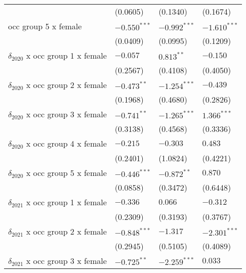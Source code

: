 \begin{tabular}{llll}
                                       &           (0.0605) &           (0.1340) &           (0.1674) \\
occ group 5 x female                   &     $-0.550^{***}$ &     $-0.992^{***}$ &     $-1.610^{***}$ \\
                                       &           (0.0409) &           (0.0995) &           (0.1209) \\
$\delta_{2020}$ x occ group 1 x female &           $-0.057$ &       $0.813^{**}$ &           $-0.150$ \\
                                       &           (0.2567) &           (0.4108) &           (0.4050) \\
$\delta_{2020}$ x occ group 2 x female &      $-0.473^{**}$ &     $-1.254^{***}$ &           $-0.439$ \\
                                       &           (0.1968) &           (0.4680) &           (0.2826) \\
$\delta_{2020}$ x occ group 3 x female &      $-0.741^{**}$ &     $-1.265^{***}$ &      $1.366^{***}$ \\
                                       &           (0.3138) &           (0.4568) &           (0.3336) \\
$\delta_{2020}$ x occ group 4 x female &           $-0.215$ &           $-0.303$ &            $0.483$ \\
                                       &           (0.2401) &           (1.0824) &           (0.4221) \\
$\delta_{2020}$ x occ group 5 x female &     $-0.446^{***}$ &      $-0.872^{**}$ &            $0.870$ \\
                                       &           (0.0858) &           (0.3472) &           (0.6448) \\
$\delta_{2021}$ x occ group 1 x female &           $-0.336$ &            $0.066$ &           $-0.312$ \\
                                       &           (0.2309) &           (0.3193) &           (0.3767) \\
$\delta_{2021}$ x occ group 2 x female &     $-0.848^{***}$ &           $-1.317$ &     $-2.301^{***}$ \\
                                       &           (0.2945) &           (0.5105) &           (0.4089) \\
$\delta_{2021}$ x occ group 3 x female &      $-0.725^{**}$ &     $-2.259^{***}$ &            $0.033$ \\

\end{tabular}
